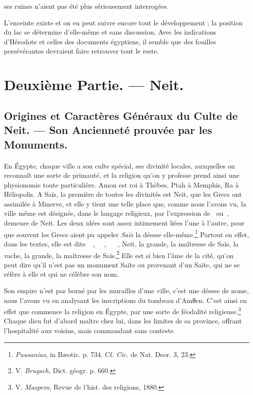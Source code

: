 \documentclass[a4paper, 11pt, oneside]{article}
\newcommand*\hieroAAAC{}
\newcommand*\hieroAAAG{}
\newcommand*\hieroAAAI{}
\newcommand*\hieroAAAO{}
\newcommand*\hieroAAAW{\raisebox{0.5ex}{}}
\newcommand*\hieroAABC{\raisebox{0.5ex}{}}
\newcommand*\hieroAACS{}
\newcommand*\hieroAAHK{}
\newcommand*\hieroAAHN{}
\newcommand*\hieroAALQ{}
\newcommand*\hieroAALR{\raisebox{0.3ex}{}}
\newcommand*\hieroAALS{}
\newcommand*\hieroAALT{}
\newcommand*\hieroAALU{\raisebox{0.5ex}{}}
\newcommand*\hieroAALV{}
\newcommand*\hieroAALW{}
\begin{document}
ses ruines n'aient pas été plus sérieusement interrogées.

L'enceinte existe et on en peut suivre encore tout le développement ; la position du lac se détermine d'elle-même et sans discussion. Avec les indications d'Hérodote et celles des documents égyptiens, il semble que des fouilles persévérantes devraient faire retrouver tout le reste.
\clearpage
\section{Deuxième Partie. --- Neit.}
\subsection{Origines et Caractères Généraux du Culte de Neit. --- Son Ancienneté prouvée par les Monuments.}
\paragraph{}
En Égypte, chaque ville a son culte spécial, ses divinité locales, auxquelles on reconnaît une sorte de primauté, et la religion qu'on y professe prend ainsi une physionomie toute particulière. Amon est roi à Thèbes, Ptah à Memphis, Ra à Héliopolis. A Saïs, la première de toutes les divinités est Neit, que les Grecs ont assimilée à Minerve, et elle y tient une telle place que, comme nous l'avons vu, la ville même est désignée, dans le langage religieux, par l'expression de $\hieroAALQ\:\hieroAAHK$ ou $\hieroAAHN\:\hieroAAAO$, demeure de Neit. Les deux idées sont assez intimement liées l'une à l'autre, pour que souvent les Grecs aient pu appeler \emph{Saïs} la déesse elle-même.\footnote{\emph{Pausanias}, in Bæotic. p. 734. Cf. \emph{Cic.} de Nat. Deor. 3, 23.} Partout en effet, dans les textes, elle est dite $\hieroAALQ\:\hieroAABC\allowbreak\:\hieroAAAI\:\hieroAAAW$, $\hieroAALR\:\hieroAALS\:\hieroAABC\allowbreak\:\hieroAAAI\:\hieroAALT$, $\hieroAAAG\:\hieroAALU\:\hieroAALV\allowbreak\:\hieroAALW\:\hieroAABC\allowbreak\:\hieroAACS\:\hieroAAAC$, Neit, la grande, la maîtresse de Saïs, la vache, la grande, la maîtresse de Saïs.\footnote{V. \emph{Brugsch}, Dict. géogr. p. 660.} Elle est si bien l'âme de la cité, qu'on peut dire qu'il n'est pas un monument Saïte ou provenant d'un Saïte, qui ne se réfère à elle et qui ne célèbre son nom.

Son empire n'est pas borné par les murailles d'une ville, c'est une déesse de nome, nous l'avons vu en analysant les inscriptions du tombeau d'Amθen. C'est ainsi en effet que commence la religion en Égypte, par une sorte de féodalité religieuse.\footnote{V. \emph{Maspero}, Revue de l'hist. des religions, 1880.} Chaque dieu fut d'abord maître chez lui, dans les limites de sa province, offrant l'hospitalité aux voisins, mais commandant sans conteste.
\end{document}
